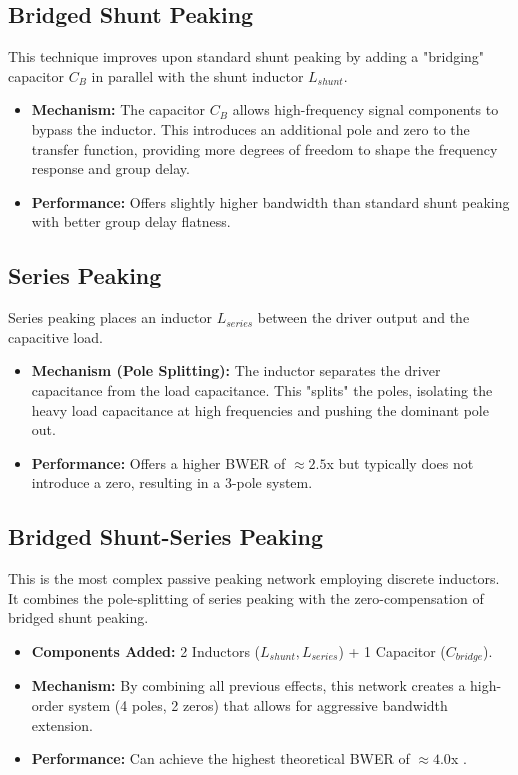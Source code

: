 \subsection{Bridged Shunt Peaking}
This technique improves upon standard shunt peaking by adding a "bridging" capacitor $C_B$ in parallel with the shunt inductor $L_{shunt}$.
\begin{itemize}
    \item \textbf{Mechanism:} The capacitor $C_B$ allows high-frequency signal components to bypass the inductor. 
    This introduces an additional pole and zero to the transfer function, providing more degrees of freedom to shape the frequency response and group delay.
    \item \textbf{Performance:} Offers slightly higher bandwidth than standard shunt peaking with better group delay flatness.
\end{itemize}

\subsection{Series Peaking}
Series peaking places an inductor $L_{series}$ between the driver output and the capacitive load.
\begin{itemize}
    \item \textbf{Mechanism (Pole Splitting):} The inductor separates the driver capacitance from the load capacitance. 
    This "splits" the poles, isolating the heavy load capacitance at high frequencies and pushing the dominant pole out.
    \item \textbf{Performance:} Offers a higher BWER of $\approx 2.5$x but typically does not introduce a zero, resulting in a 3-pole system.
\end{itemize}

\subsection{Bridged Shunt-Series Peaking}
This is the most complex passive peaking network employing discrete inductors. It combines the pole-splitting of series peaking with the zero-compensation of bridged shunt peaking.
\begin{itemize}
    \item \textbf{Components Added:} 2 Inductors ($L_{shunt}, L_{series}$) + 1 Capacitor ($C_{bridge}$).
    \item \textbf{Mechanism:} By combining all previous effects, this network creates a high-order system (4 poles, 2 zeros) that allows for aggressive bandwidth extension.
    \item \textbf{Performance:} Can achieve the highest theoretical BWER of $\approx 4.0$x \cite{shekhar}.
\end{itemize}

